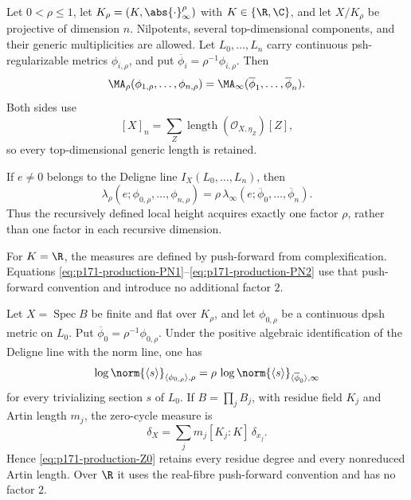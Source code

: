 \begin{theorem}
\label{thm:p171-production-powered-normalization}
Let \(0<\rho\leq1\), let
\(K_\rho=(K,\abs{\cdot}_\infty^\rho)\) with
\(K\in\{\R,\C\}\), and let \(X/K_\rho\) be projective of dimension \(n\).
Nilpotents, several top-dimensional components, and their generic
multiplicities are allowed.  Let \(L_0,\ldots,L_n\) carry continuous
psh-regularizable metrics \(\phi_{i,\rho}\), and put
\(\overline\phi_i=\rho^{-1}\phi_{i,\rho}\).  Then
\begin{equation}
 \MA_\rho(\phi_{1,\rho},\ldots,\phi_{n,\rho})
 =
 \MA_\infty(\overline\phi_1,\ldots,\overline\phi_n).
 \label{eq:p171-production-PN1}
\end{equation}
Both sides use
\[
 [X]_n=\sum_Z
 \operatorname{length}(\mathcal O_{X,\eta_Z})[Z],
\]
so every top-dimensional generic length is retained.

If \(e\neq0\) belongs to the Deligne line
\(I_X(L_0,\ldots,L_n)\), then
\begin{equation}
 \lambda_\rho
 (e;\phi_{0,\rho},\ldots,\phi_{n,\rho})
 =
 \rho\,
 \lambda_\infty
 (e;\overline\phi_0,\ldots,\overline\phi_n).
 \label{eq:p171-production-PN2}
\end{equation}
Thus the recursively defined local height acquires exactly one factor
\(\rho\), rather than one factor in each recursive dimension.

For \(K=\R\), the measures are defined by push-forward from
complexification.  Equations
\eqref{eq:p171-production-PN1}--\eqref{eq:p171-production-PN2} use that
push-forward convention and introduce no additional factor \(2\).
\end{theorem}

\begin{lemma}
\label{lem:p171-production-dimension-zero}
Let \(X=\operatorname{Spec}B\) be finite and flat over \(K_\rho\), and let
\(\phi_{0,\rho}\) be a continuous dpsh metric on \(L_0\).  Put
\(\overline\phi_0=\rho^{-1}\phi_{0,\rho}\).  Under the positive algebraic
identification of the Deligne line with the norm line, one has
\begin{equation}
 \log\norm{\langle s\rangle}_{\langle\phi_{0,\rho}\rangle,\rho}
 =
 \rho\,
 \log\norm{\langle s\rangle}_{\langle\overline\phi_0\rangle,\infty}
 \label{eq:p171-production-Z0}
\end{equation}
for every trivializing section \(s\) of \(L_0\).  If
\(B=\prod_jB_j\), with residue field \(K_j\) and Artin length \(m_j\), the
zero-cycle measure is
\[
 \delta_X=\sum_jm_j[K_j:K]\,\delta_{x_j}.
\]
Hence \eqref{eq:p171-production-Z0} retains every residue degree and every
nonreduced Artin length.  Over \(\R\) it uses the real-fibre push-forward
convention and has no factor \(2\).
\end{lemma}

